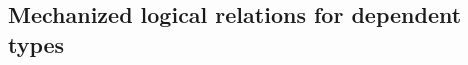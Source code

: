 \documentclass[\ifpublic nolinenum\else\fi,online,OA]{jfp}
\theoremstyle{definition}
\begin{document}

\subsection{Mechanized logical relations for dependent types}
\end{document}
